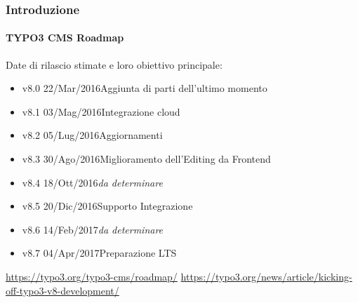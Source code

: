 \begin{frame}[fragile]
	\frametitle{Introduzione}
	\framesubtitle{TYPO3 CMS Roadmap}

	Date di rilascio stimate e loro obiettivo principale:

	\begin{itemize}

		\item v8.0 \tabto{1.1cm}22/Mar/2016\tabto{3.4cm}Aggiunta di parti dell'ultimo momento
		\item v8.1 \tabto{1.1cm}03/Mag/2016\tabto{3.4cm}Integrazione cloud
		\item
			\begingroup
				\color{typo3orange}
					v8.2 \tabto{1.1cm}05/Lug/2016\tabto{3.4cm}Aggiornamenti
			\endgroup
		\item
			\begingroup
				\color{typo3orange}
					v8.3 \tabto{1.1cm}30/Ago/2016\tabto{3.4cm}Miglioramento dell'Editing da Frontend
			\endgroup
		\item v8.4 \tabto{1.1cm}18/Ott/2016\tabto{3.4cm}\textit{da determinare}
		\item v8.5 \tabto{1.1cm}20/Dic/2016\tabto{3.4cm}Supporto Integrazione
		\item v8.6 \tabto{1.1cm}14/Feb/2017\tabto{3.4cm}\textit{da determinare}
		\item v8.7 \tabto{1.1cm}04/Apr/2017\tabto{3.4cm}Preparazione LTS

	\end{itemize}

	\smaller
		\url{https://typo3.org/typo3-cms/roadmap/}\newline
		\url{https://typo3.org/news/article/kicking-off-typo3-v8-development/}
	\normalsize

\end{frame}

